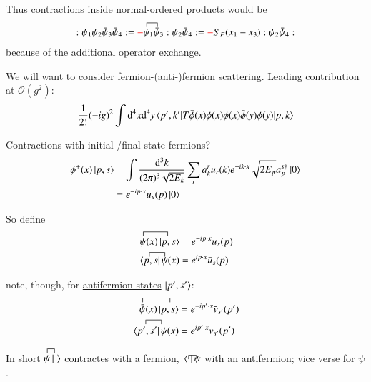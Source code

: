 Thus contractions inside normal-ordered products would be
\begin{align*}
	:\psi_1 \psi_2 \bar{\psi}_3 \bar{\psi}_4:= \textcolor{red}{-} \contraction{}{\psi}{_1}{\bar{\psi}}\psi_1\bar{\psi}_3 :\psi_2 \bar{\psi}_4: = \textcolor{red}{-} S_F(x_1 - x_3) :\psi_2 \bar{\psi}_4:
\end{align*}
because of the additional operator exchange.

We will want to consider fermion-(anti-)fermion scattering. Leading contribution at $\mathcal{O}(g^2)$:
\begin{align*}
	\frac{1}{2!} (-ig)^2 \int \dd^4 x \dd^4 y \braket{p', k' |T\bar{\phi}(x) \phi(x) \phi(x) \bar{\phi}(y)\phi(y)|p,k}
\end{align*}

Contractions with initial-/final-state fermions?
\begin{align*}
	\phi^+(x) \ket{p,s} &= \int \frac{\dd^3 k}{(2\pi)^3 \sqrt{2E_k}} \sum_r a^r_k u_r(k) e^{-ik\cdot x} \sqrt{2E_p} a^{s\dagger}_p \ket{0} \\
						&= e^{-ip\cdot x} u_s(p) \ket{0}	
\end{align*}

So define
\begin{align}
	\begin{split}
	\contraction{}{\psi}{(x)|}{p,s} \psi(x) \ket{p,s} &=  e^{-ip\cdot x} u_s(p) \\
	\contraction{\langle}{p,s}{|\;}{\bar\psi} \bra{p,s}\bar\psi(x)  &=  e^{ip\cdot x} \bar{u}_s(p)
	\end{split}
\end{align}

note, though, for \underline{antifermion states} $\ket{p', s'}$:
\begin{align}
	\begin{split}
	\contraction{}{\bar{\psi}}{(x)|}{p',s'} \bar{\psi}(x) \ket{p,s} &=  e^{-ip' \cdot x} \bar{v}_{s'}(p') \\
	\contraction{\langle}{p',s'}{|}{\psi} \bra{p',s'}\psi(x)  &=  e^{ip'\cdot x} v_{s'}(p')
	\end{split}
\end{align}

In short $\contraction{}{\psi}{|}{\;} \psi \ket{\;} $ contractes with a fermion, $\contraction{\langle}{\,\;}{|}{\psi} \bra{\;}\psi$ with an antifermion; vice verse for $\bar{\psi}$.

